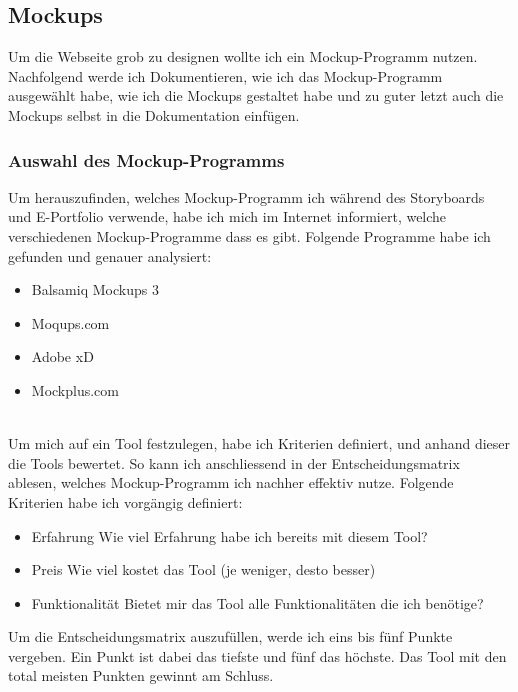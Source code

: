 \documentclass[11pt]{article}
\begin{document}
    \subsection{Mockups}
    Um die Webseite grob zu designen wollte ich ein Mockup-Programm nutzen. Nachfolgend werde ich Dokumentieren,
    wie ich das Mockup-Programm ausgewählt habe, wie ich die Mockups gestaltet habe und zu guter letzt auch
    die Mockups selbst in die Dokumentation einfügen.

    \subsubsection{Auswahl des Mockup-Programms}
    Um herauszufinden, welches Mockup-Programm ich während des Storyboards und E-Portfolio verwende, habe ich
    mich im Internet informiert, welche verschiedenen Mockup-Programme dass es gibt. Folgende Programme habe
    ich gefunden und genauer analysiert:

    \begin{itemize}
        \item Balsamiq Mockups 3
        \item Moqups.com
        \item Adobe xD
        \item Mockplus.com
    \end{itemize}\\
    Um mich auf ein Tool festzulegen, habe ich Kriterien definiert, und anhand dieser die Tools bewertet. So
    kann ich anschliessend in der Entscheidungsmatrix ablesen, welches Mockup-Programm ich nachher effektiv
    nutze. Folgende Kriterien habe ich vorgängig definiert:

    \begin{itemize}
        \item Erfahrung \textrightarrow Wie viel Erfahrung habe ich bereits mit diesem Tool?
        \item Preis \textrightarrow Wie viel kostet das Tool (je weniger, desto besser)
        \item Funktionalität \textrightarrow Bietet mir das Tool alle Funktionalitäten die ich benötige?
    \end{itemize}
    Um die Entscheidungsmatrix auszufüllen, werde ich eins bis fünf Punkte vergeben. Ein Punkt ist dabei das tiefste
    und fünf das höchste. Das Tool mit den total meisten Punkten gewinnt am Schluss.\\
\end{document}

